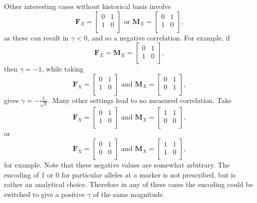 \documentclass[sts]{imsart}
\newcommand{\m}[1]{\mathbf{#1}}               %
\begin{document}
Other interesting cases without historical basis involve
$$\m{F}_X = \begin{bmatrix}
  0 & 1 \\
  1 & 0 \\
\end{bmatrix} \text{ or } \m{M}_X = \begin{bmatrix}
  0 & 1 \\
  1 & 0 \\
\end{bmatrix},$$
as these can result in $\gamma < 0$, and so a negative correlation. For example, if
$$\m{F}_X = \m{M}_X = \begin{bmatrix}
  0 & 1 \\
  1 & 0 \\
\end{bmatrix},$$
then $\gamma = -1$, while taking
$$\m{F}_X = \begin{bmatrix}
  0 & 1 \\
  1 & 0 \\
\end{bmatrix} \text{ and } \m{M}_X = \begin{bmatrix}
  0 & 1 \\
  0 & 1 \\
\end{bmatrix},$$
gives $\gamma = -\frac{1}{\sqrt{2}}$. Many other settings lead to no measured correlation. Take
$$\m{F}_X = \begin{bmatrix}
  0 & 1 \\
  1 & 0 \\
\end{bmatrix} \text{ and } \m{M}_X = \begin{bmatrix}
  1 & 1 \\
  0 & 0 \\
\end{bmatrix},$$
or
$$\m{F}_X = \begin{bmatrix}
  0 & 1 \\
  0 & 0 \\
\end{bmatrix} \text{ and } \m{M}_X = \begin{bmatrix}
  1 & 1 \\
  1 & 0 \\
\end{bmatrix},$$
for example. Note that these negative values are somewhat arbitrary. The encoding of 1 or 0 for particular alleles at a marker is not prescribed, but is rather an analytical choice. Therefore in any of these cases the encoding could be switched to give a positive $\gamma$ of the same magnitude. 
\end{document}
